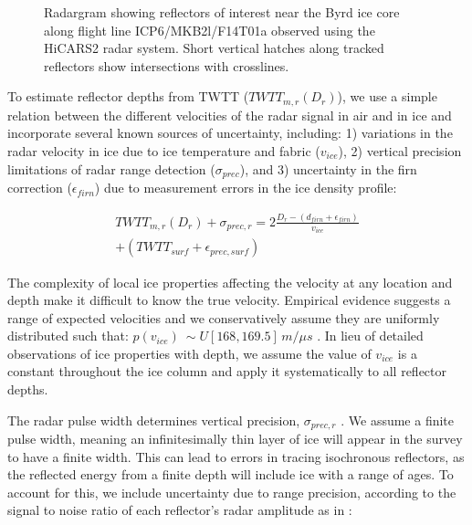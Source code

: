 \begin{figure*}
\centering
{}
\caption{Radargram showing reflectors of interest near the Byrd ice core along flight line ICP6/MKB2l/F14T01a observed using the HiCARS2 radar system. Short vertical hatches along tracked reflectors show intersections with crosslines.}
\label{fig:layergram}
\end{figure*}


To estimate reflector depths from TWTT ($TWTT_{m,r}(D_r)$), we use a simple relation between the different velocities of the radar signal in air and in ice and incorporate several known sources of uncertainty, including: 1) variations in the radar velocity in ice due to ice temperature and fabric ($v_{ice}$), 2) vertical precision limitations of radar range detection ($\sigma_{prec}$), and 3) uncertainty in the firn correction ($\epsilon_{firn}$) due to measurement errors in the ice density profile:

\begin{equation}\label{deptheqn}
\begin{split}
TWTT_{m,r}(D_r) + \sigma_{prec,r} = 2 \frac{D_r - (d_{firn}+\epsilon_{firn})}{v_{ice}} \\
+ (TWTT_{surf} + \epsilon_{prec,surf})
\end{split}
\end{equation}

The complexity of local ice properties affecting the velocity at any location and depth make it difficult to know the true velocity. Empirical evidence suggests a range of expected velocities and we conservatively assume they are uniformly distributed such that: $p(v_{ice}) ~\sim U[168,169.5]\,m/{\mu}s$ \citep{fujita2000}. In lieu of detailed observations of ice properties with depth, we assume the value of $v_{ice}$ is a constant throughout the ice column and apply it systematically to all reflector depths.

The radar pulse width determines vertical precision, $\sigma_{prec,r}$ \citep{millar1982}. We assume a finite pulse width, meaning an infinitesimally thin layer of ice will appear in the survey to have a finite width. This can lead to errors in tracing isochronous reflectors, as the reflected energy from a finite depth will include ice with a range of ages. To account for this, we include uncertainty due to range precision, according to the signal to noise ratio of each reflector's radar amplitude as in \citet{cavitte2016}:

